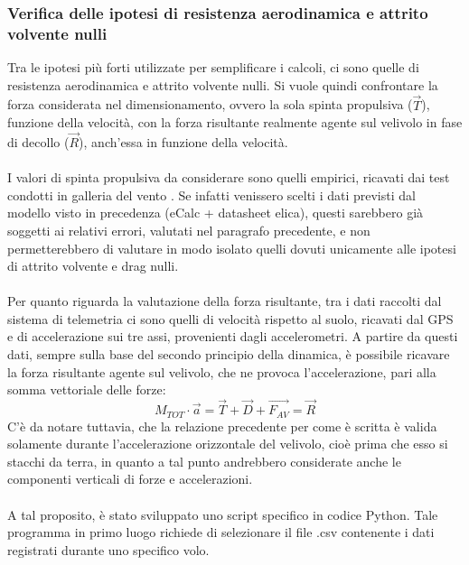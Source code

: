\documentclass[12pt]{article}
\begin{document}
\subsubsection{Verifica delle ipotesi di resistenza aerodinamica e attrito volvente nulli}
Tra le ipotesi più forti utilizzate per semplificare i calcoli, ci sono quelle di resistenza aerodinamica e attrito volvente nulli. Si vuole quindi confrontare la forza considerata nel dimensionamento, ovvero la sola spinta propulsiva ($\overrightarrow{T}$), funzione della velocità, con la forza risultante realmente agente sul velivolo in fase di decollo ($\overrightarrow{R}$), anch'essa in funzione della velocità. 
\\\\
I valori di spinta propulsiva da considerare sono quelli empirici, ricavati dai test condotti in galleria del vento \cite{windtunnel}. Se infatti venissero scelti i dati previsti dal modello visto in precedenza (eCalc + datasheet elica), questi sarebbero già soggetti ai relativi errori, valutati nel paragrafo precedente, e non permetterebbero di valutare in modo isolato quelli dovuti unicamente alle ipotesi di attrito volvente e drag nulli.
\\\\
Per quanto riguarda la valutazione della forza risultante, tra i dati raccolti dal sistema di telemetria ci sono quelli di velocità rispetto al suolo, ricavati dal GPS e di accelerazione sui tre assi, provenienti dagli accelerometri. A partire da questi dati, sempre sulla base del secondo principio della dinamica, è possibile ricavare la forza risultante agente sul velivolo, che ne provoca l'accelerazione, pari alla somma vettoriale delle forze:
\begin{equation}
M_{TOT} \cdot \overrightarrow{a} = \overrightarrow{T} + \overrightarrow{D} + \overrightarrow{F_{AV}} = \overrightarrow{R}
\end{equation}
C'è da notare tuttavia, che la relazione precedente per come è scritta è valida solamente durante l'accelerazione orizzontale del velivolo, cioè prima che esso si stacchi da terra, in quanto a tal punto andrebbero considerate anche le componenti verticali di forze e accelerazioni.
\\\\
\noindent
A tal proposito, è stato sviluppato uno script specifico in codice Python. Tale programma in primo luogo richiede di selezionare il file .csv contenente i dati registrati durante uno specifico volo. 
\\\\
\end{document}
